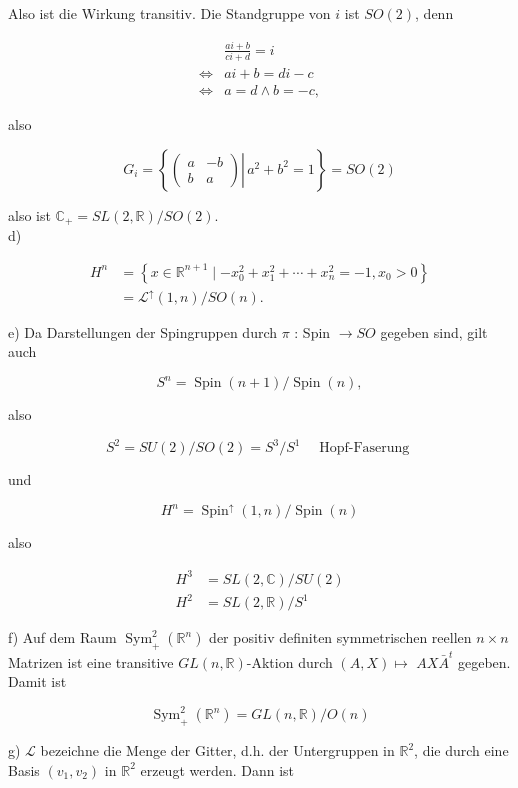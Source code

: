 \documentclass[10pt, letterpaper]{article}
\begin{document}
Also ist die Wirkung transitiv. Die Standgruppe von $i$ ist $S O(2)$, denn

$$
\begin{aligned}
& \frac{a i+b}{c i+d}=i \\
\Leftrightarrow & a i+b=d i-c \\
\Leftrightarrow & a=d \wedge b=-c,
\end{aligned}
$$

also

$$
G_{i}=\left\{\left.\left(\begin{array}{cc}
a & -b \\
b & a
\end{array}\right) \right\rvert\, a^{2}+b^{2}=1\right\}=S O(2)
$$

also ist $\mathbb{C}_{+}=S L(2, \mathbb{R}) / S O(2)$.\\
d)

$$
\begin{aligned}
H^{n} & =\left\{x \in \mathbb{R}^{n+1} \mid-x_{0}^{2}+x_{1}^{2}+\cdots+x_{n}^{2}=-1, x_{0}>0\right\} \\
& =\mathcal{L}^{\uparrow}(1, n) / S O(n) .
\end{aligned}
$$

e) Da Darstellungen der Spingruppen durch $\pi$ : Spin $\rightarrow S O$ gegeben sind, gilt auch

$$
S^{n}=\operatorname{Spin}(n+1) / \operatorname{Spin}(n),
$$

also

$$
S^{2}=S U(2) / S O(2)=S^{3} / S^{1} \quad \text { Hopf-Faserung }
$$

und

$$
H^{n}=\operatorname{Spin}^{\uparrow}(1, n) / \operatorname{Spin}(n)
$$

also

$$
\begin{aligned}
H^{3} & =S L(2, \mathbb{C}) / S U(2) \\
H^{2} & =S L(2, \mathbb{R}) / S^{1}
\end{aligned}
$$

f) Auf dem Raum $\operatorname{Sym}_{+}^{2}\left(\mathbb{R}^{n}\right)$ der positiv definiten symmetrischen reellen $n \times n$ Matrizen ist eine transitive $G L(n, \mathbb{R})$-Aktion durch $(A, X) \mapsto$ $A X \bar{A}^{t}$ gegeben. Damit ist

$$
\operatorname{Sym}_{+}^{2}\left(\mathbb{R}^{n}\right)=G L(n, \mathbb{R}) / O(n)
$$

g) $\mathcal{L}$ bezeichne die Menge der Gitter, d.h. der Untergruppen in $\mathbb{R}^{2}$, die durch eine Basis $\left(v_{1}, v_{2}\right)$ in $\mathbb{R}^{2}$ erzeugt werden. Dann ist
\end{document}
